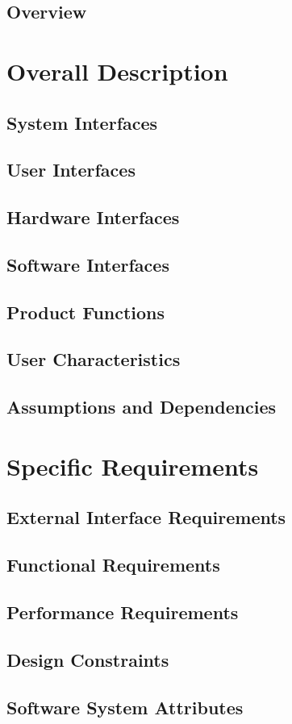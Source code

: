 \documentclass[12pt,a4paper]{article}
\begin{document}
   	\subsection{Overview}

   \section{Overall Description}
   	\subsection{System Interfaces}
   	
   	\subsection{User Interfaces}
   		
   	\subsection{Hardware Interfaces}
   	
   	\subsection{Software Interfaces}
   	\subsection{Product Functions}
	\subsection{User Characteristics}   	
   	\subsection{Assumptions and Dependencies}

   \section{Specific Requirements}
	\subsection{External Interface Requirements}
	
	\subsection{Functional Requirements}
		
	\subsection{Performance Requirements}
	
	\subsection{Design Constraints}
	
	\subsection{Software System Attributes}
   
\end{document}
